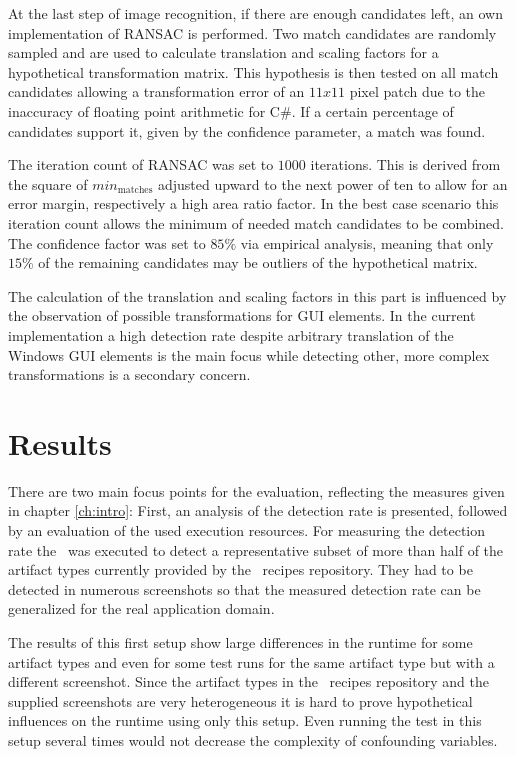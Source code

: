 At the last step of image recognition, if there are enough candidates left, an own implementation of RANSAC is performed. Two match candidates are randomly sampled and are used to calculate translation and scaling factors for a hypothetical transformation matrix. This hypothesis is then tested on all match candidates allowing a transformation error of an $11x11$ pixel patch due to the inaccuracy of floating point arithmetic for C\#. If a certain percentage of candidates support it, given by the confidence parameter, a match was found.

The iteration count of RANSAC was set to $1000$ iterations. This is derived from the square of $min_{\text{matches}}$ adjusted upward to the next power of ten to allow for an error margin, respectively a high area ratio factor. In the best case scenario this iteration count allows the minimum of needed match candidates to be combined. The confidence factor was set to $85\%$ via empirical analysis, meaning that only $15\%$ of the remaining candidates may be outliers of the hypothetical matrix.

The calculation of the translation and scaling factors in this part is influenced by the observation of possible transformations for GUI elements. In the current implementation a high detection rate despite arbitrary translation of the Windows GUI elements is the main focus while detecting other, more complex transformations is a secondary concern.

\chapter{Results}\label{ch:results}

There are two main focus points for the evaluation, reflecting the measures given in chapter \ref{ch:intro}: First, an analysis of the detection rate is presented, followed by an evaluation of the used execution resources. For measuring the detection rate the \vd~was executed to detect a representative subset of more than half of the artifact types currently provided by the \ape~recipes repository. They had to be detected in numerous screenshots so that the measured detection rate can be generalized for the real application domain.

The results of this first setup show large differences in the runtime for some artifact types and even for some test runs for the same artifact type but with a different screenshot. Since the artifact types in the \ape~recipes repository and the supplied screenshots are very heterogeneous it is hard to prove hypothetical influences on the runtime using only this setup. Even running the test in this setup several times would not decrease the complexity of confounding variables.

